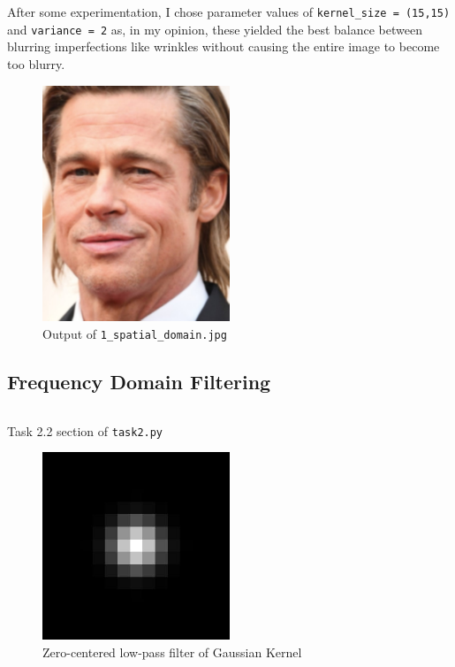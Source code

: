 \documentclass[a4paper]{article}
\newenvironment{code}{\captionsetup{type=listing}}{}
\begin{document}
After some experimentation, I chose parameter values of \texttt{kernel_size = (15,15)} and \texttt{variance = 2} as, in my opinion, these yielded the best balance between blurring imperfections like wrinkles without causing the entire image to become too blurry.

\begin{figure}[H]
    \centering
    \includegraphics[width=0.5\textwidth]{../code/task2/output/1_spatial_domain.jpg}
    \caption{Output of \texttt{1_spatial_domain.jpg}}
\end{figure}

\subsection{Frequency Domain Filtering}
\begin{code}
\inputminted[firstline=15, lastline=29, linenos, breaklines, frame=single]{python}{../code/task2/task2.py}
\caption{Task 2.2 section of \texttt{task2.py}}
\end{code}

\begin{figure}[H]
    \centering
    \includegraphics[width=0.5\textwidth]{../code/task2/output/2_frequency_domain_low-pass_filter.jpg}
    \caption{Zero-centered low-pass filter of Gaussian Kernel}
\end{figure}
\end{document}
